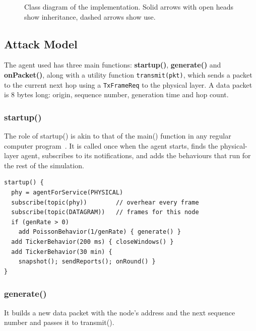 \documentclass[conference]{IEEEtran}
\begin{document}
\begin{figure}[t]
\caption{Class diagram of the implementation. Solid arrows with open heads show inheritance, dashed arrows show use.}\label{fig:classes}
\end{figure}

\subsection{Attack Model}
The agent used has three main functions: \textbf{startup()}, \textbf{generate()} and \textbf{onPacket()}, along with a utility function \texttt{transmit(pkt)}, which sends a packet to the current next hop using a \texttt{TxFrameReq} to the physical layer. A data packet is 8 bytes long: origin, sequence number, generation time and hop count.

\subsubsection{startup()}
The role of startup() is akin to that of the main() function in any regular computer program~\cite{chitre}. It is called once when the agent starts, finds the physical-layer agent, subscribes to its notifications, and adds the behaviours that run for the rest of the simulation.
\begin{lstlisting}
startup() {
  phy = agentForService(PHYSICAL)
  subscribe(topic(phy))        // overhear every frame
  subscribe(topic(DATAGRAM))   // frames for this node
  if (genRate > 0)
    add PoissonBehavior(1/genRate) { generate() }
  add TickerBehavior(200 ms) { closeWindows() }
  add TickerBehavior(30 min) {
    snapshot(); sendReports(); onRound() }
}
\end{lstlisting}

\subsubsection{generate()}
It builds a new data packet with the node's address and the next sequence number and passes it to transmit().
\end{document}
